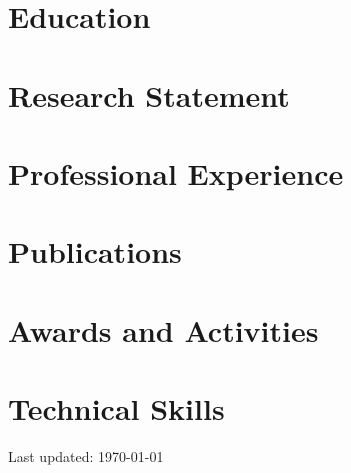 \documentclass[10pt]{article}
\begin{document}
% 
% 


\section*{\color{blue}Education}


\section*{\color{blue} Research Statement}


\section*{\color{blue} Professional Experience}

\section*{\color{blue} Publications} 


\section*{\color{blue} Awards and Activities}


\section*{\color{blue} Technical Skills}


\bigskip
\begin{center}
  \begin{footnotesize}
    Last updated: \today
  \end{footnotesize}
\end{center}

\end{document}

